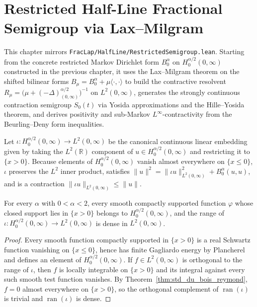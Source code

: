 \chapter{Restricted Half-Line Fractional Semigroup via Lax--Milgram}

This chapter mirrors \texttt{FracLap/HalfLine/RestrictedSemigroup.lean}. Starting from the concrete restricted Markov Dirichlet form $B^\alpha_0$ on $H^{\alpha/2}_0(0,\infty)$ constructed in the previous chapter, it uses the Lax--Milgram theorem on the shifted bilinear forms $B_\mu = B^\alpha_0 + \mu \langle \cdot, \cdot \rangle$ to build the contractive resolvent $R_\mu = \bigl(\mu + (-\Delta)_{(0,\infty)}^{\alpha/2}\bigr)^{-1}$ on $L^2(0,\infty)$, generates the strongly continuous contraction semigroup $S_0(t)$ via Yosida approximations and the Hille--Yosida theorem, and derives positivity and sub-Markov $L^\infty$-contractivity from the Beurling--Deny form inequalities.

\begin{definition}\label{def:restricted_l2_map}
\leanok
Let $\iota : H^{\alpha/2}_0(0,\infty) \to L^2(0,\infty)$ be the canonical continuous linear embedding given by taking the $L^2(\mathbb{R})$ component of $u \in H^{\alpha/2}_0(0,\infty)$ and restricting it to $\{x > 0\}$. Because elements of $H^{\alpha/2}_0(0,\infty)$ vanish almost everywhere on $\{x \le 0\}$, $\iota$ preserves the $L^2$ inner product, satisfies $\lVert u \rVert^2 = \lVert \iota u \rVert_{L^2(0,\infty)}^2 + B^\alpha_0(u, u)$, and is a contraction $\lVert \iota u \rVert_{L^2(0,\infty)} \le \lVert u \rVert$.
\end{definition}

\begin{lemma}\label{lem:dense_range_restricted_l2_map}
\leanok
For every $\alpha$ with $0 < \alpha < 2$, every smooth compactly supported function $\varphi$ whose closed support lies in $\{x > 0\}$ belongs to $H^{\alpha/2}_0(0,\infty)$, and the range of $\iota : H^{\alpha/2}_0(0,\infty) \to L^2(0,\infty)$ is dense in $L^2(0,\infty)$.
\end{lemma}

\begin{proof}
\leanok
Every smooth function compactly supported in $\{x > 0\}$ is a real Schwartz function vanishing on $\{x \le 0\}$, hence has finite Gagliardo energy by Plancherel and defines an element of $H^{\alpha/2}_0(0,\infty)$. If $f \in L^2(0,\infty)$ is orthogonal to the range of $\iota$, then $f$ is locally integrable on $\{x > 0\}$ and its integral against every such smooth test function vanishes. By Theorem~\ref{thm:std_du_bois_reymond}, $f = 0$ almost everywhere on $\{x > 0\}$, so the orthogonal complement of $\operatorname{ran}(\iota)$ is trivial and $\operatorname{ran}(\iota)$ is dense.
\end{proof}

